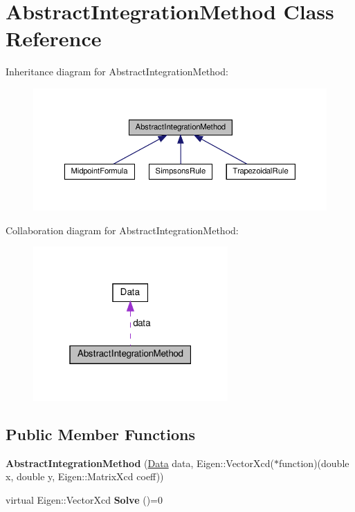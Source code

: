 \hypertarget{classAbstractIntegrationMethod}{}\section{Abstract\+Integration\+Method Class Reference}
\label{classAbstractIntegrationMethod}


Inheritance diagram for Abstract\+Integration\+Method\+:
\nopagebreak
\begin{figure}[H]
\begin{center}
\leavevmode
\includegraphics[width=350pt]{classAbstractIntegrationMethod__inherit__graph}
\end{center}
\end{figure}


Collaboration diagram for Abstract\+Integration\+Method\+:
\nopagebreak
\begin{figure}[H]
\begin{center}
\leavevmode
\includegraphics[width=211pt]{classAbstractIntegrationMethod__coll__graph}
\end{center}
\end{figure}
\subsection*{Public Member Functions}
\begin{DoxyCompactItemize}
\item 
\mbox{\label{classAbstractIntegrationMethod_a2b3a0208c99564d496e27b383fc4d96f}} 
{\bfseries Abstract\+Integration\+Method} (\hyperlink{structData}{Data} data, Eigen\+::\+Vector\+Xcd($\ast$function)(double x, double y, Eigen\+::\+Matrix\+Xcd coeff))
\item 
\mbox{\label{classAbstractIntegrationMethod_af76e5bdce7d0b139d07e920fa29c1c34}} 
virtual Eigen\+::\+Vector\+Xcd {\bfseries Solve} ()=0
\end{DoxyCompactItemize}
